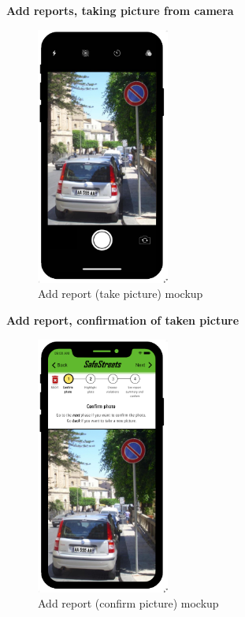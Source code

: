 					\begin{center}
						{\small \textbf{Add reports, taking picture from camera}}
					\end{center}
					\vspace{-5mm}
					\begin{figure}[!h]
						\centering
						\includegraphics[height=8.5cm]{images/MockUp/User/Report0Camera.pdf}
						\caption{Add report (take picture) mockup}
					\end{figure}
					\vspace{-1mm}
					\begin{center}
						{\small \textbf{Add report, confirmation of taken picture}}
					\end{center}
					\vspace{-5mm}
					\begin{figure}[!h]
						\centering
						\includegraphics[height=8.5cm]{images/MockUp/User/Report1ConfirmPhoto.pdf}
						\caption{Add report (confirm picture) mockup}
					\end{figure}
					\clearpage
					
